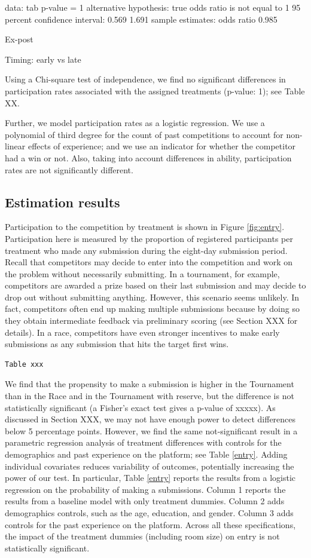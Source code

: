 \documentclass[12pt,]{article}
\theoremstyle{plain} %
\begin{document}
data: tab p-value = 1 alternative hypothesis: true odds ratio is not
equal to 1 95 percent confidence interval: 0.569 1.691 sample estimates:
odds ratio 0.985

Ex-post

Timing: early vs late

Using a Chi-square test of independence, we find no significant
differences in participation rates associated with the assigned
treatments (p-value: 1); see Table XX.

Further, we model participation rates as a logistic regression. We use a
polynomial of third degree for the count of past competitions to account
for non-linear effects of experience; and we use an indicator for
whether the competitor had a win or not. Also, taking into account
differences in ability, participation rates are not significantly
different.

\subsection{Estimation results}\label{estimation-results}

Participation to the competition by treatment is shown in Figure
\ref{fig:entry}. Participation here is measured by the proportion of
registered participants per treatment who made any submission during the
eight-day submission period. Recall that competitors may decide to enter
into the competition and work on the problem without necessarily
submitting. In a tournament, for example, competitors are awarded a
prize based on their last submission and may decide to drop out without
submitting anything. However, this scenario seems unlikely. In fact,
competitors often end up making multiple submissions because by doing so
they obtain intermediate feedback via preliminary scoring (see Section
XXX for details). In a race, competitors have even stronger incentives
to make early submissions as any submission that hits the target first
wins.

\begin{verbatim}
Table xxx
\end{verbatim}

We find that the propensity to make a submission is higher in the
Tournament than in the Race and in the Tournament with reserve, but the
difference is not statistically significant (a Fisher's exact test gives
a p-value of xxxxx). As discussed in Section XXX, we may not have enough
power to detect differences below 5 percentage points. However, we find
the same not-significant result in a parametric regression analysis of
treatment differences with controls for the demographics and past
experience on the platform; see Table \ref{entry}. Adding individual
covariates reduces variability of outcomes, potentially increasing the
power of our test. In particular, Table \ref{entry} reports the results
from a logistic regression on the probability of making a submissions.
Column 1 reports the results from a baseline model with only treatment
dummies. Column 2 adds demographics controls, such as the age,
education, and gender. Column 3 adds controls for the past experience on
the platform. Across all these specifications, the impact of the
treatment dummies (including room size) on entry is not statistically
significant.
\end{document}
